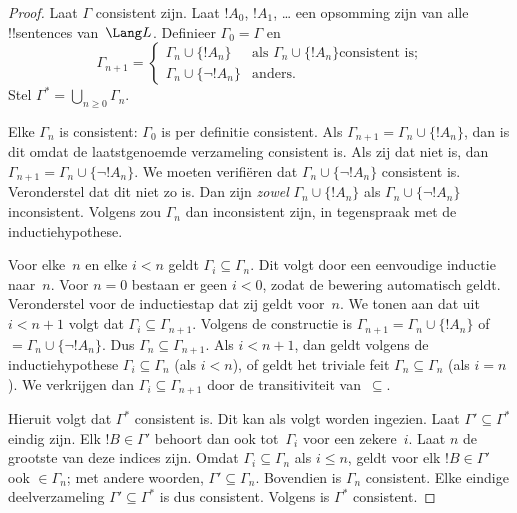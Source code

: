 \documentclass[../../../include/open-logic-section]{subfiles}
\begin{document}
\begin{proof}
Laat $\Gamma$ consistent zijn. Laat $!A_0$, $!A_1$, \dots{} een
opsomming zijn van alle !!{sentence}s van~$\Lang L$. Definieer
$\Gamma_0 = \Gamma$ en
\[
\Gamma_{n+1} =
\begin{cases}
\Gamma_n \cup \{ !A_n \} & \textrm{als $\Gamma_n \cup \{!A_n\}$
  consistent is;} \\
\Gamma_n \cup \{ \lnot !A_n \} & \textrm{anders.}
\end{cases}
\]
Stel $\Gamma^* = \bigcup_{n \geq 0} \Gamma_n$.

Elke $\Gamma_n$ is consistent: $\Gamma_0$ is per definitie consistent.
Als $\Gamma_{n+1} = \Gamma_n \cup \{!A_n\}$, dan is dit omdat de
laatstgenoemde verzameling consistent is. Als zij dat niet is, dan
$\Gamma_{n+1} = \Gamma_n \cup \{\lnot !A_n\}$. We moeten verifiëren dat
$\Gamma_n \cup \{\lnot !A_n\}$ consistent is. Veronderstel dat dit niet
zo is. Dan zijn \emph{zowel} $\Gamma_n \cup \{!A_n\}$ als
$\Gamma_n \cup \{\lnot !A_n\}$ inconsistent. Volgens
zou $\Gamma_n$ dan inconsistent zijn, in tegenspraak met de
inductiehypothese.

Voor elke~$n$ en elke $i < n$ geldt $\Gamma_i \subseteq \Gamma_n$. Dit
volgt door een eenvoudige inductie naar~$n$. Voor $n=0$ bestaan er geen
$i < 0$, zodat de bewering automatisch geldt. Veronderstel voor de
inductiestap dat zij geldt voor~$n$. We tonen aan dat uit $i < n+1$
volgt dat $\Gamma_i \subseteq \Gamma_{n+1}$. Volgens de constructie is
$\Gamma_{n+1} = \Gamma_n \cup \{!A_n\}$ of $= \Gamma_n \cup \{\lnot
!A_n\}$. Dus $\Gamma_n \subseteq \Gamma_{n+1}$. Als $i < n+1$, dan
geldt volgens de inductiehypothese $\Gamma_i \subseteq \Gamma_n$ (als
$i < n$), of geldt het triviale feit $\Gamma_n \subseteq \Gamma_n$ (als
$i = n$). We verkrijgen dan $\Gamma_i \subseteq \Gamma_{n+1}$ door de
transitiviteit van~$\subseteq$.

Hieruit volgt dat $\Gamma^*$ consistent is. Dit kan als volgt worden
ingezien. Laat $\Gamma' \subseteq \Gamma^*$ eindig zijn. Elk
$!B \in \Gamma'$ behoort dan ook tot~$\Gamma_i$ voor een zekere~$i$.
Laat $n$ de grootste van deze indices zijn. Omdat
$\Gamma_i \subseteq \Gamma_n$ als $i \le n$, geldt voor elk
$!B \in \Gamma'$ ook $\in \Gamma_n$; met andere woorden,
$\Gamma' \subseteq \Gamma_n$. Bovendien is $\Gamma_n$ consistent. Elke
eindige deelverzameling $\Gamma' \subseteq \Gamma^*$ is dus consistent.
Volgens  is $\Gamma^*$ consistent.


\end{proof}
\end{document}
